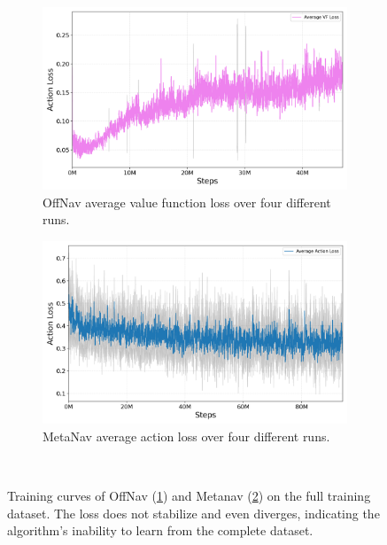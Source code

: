 \begin{figure}
    \centering
    \begin{subfigure}[b]{0.49\linewidth}
        \centering
        \includegraphics[width=\linewidth]{figures/offnav/offnav_losses_avg_std}
        \caption{OffNav average value function loss over four different runs.}
        \label{fig:training_problems_offnav}
    \end{subfigure}
    \hfill
    \begin{subfigure}[b]{0.49\linewidth}
        \centering
        \includegraphics[width=\linewidth]{figures/metanav/metanav_losses_avg_std}
        \caption{MetaNav average action loss over four different runs.}
        \label{fig:training_problems_metanav}
    \end{subfigure}~\caption{Training curves of OffNav (\ref{fig:training_problems_offnav}) and Metanav (\ref{fig:training_problems_metanav}) on the full training dataset. The loss does not stabilize and even diverges, indicating the algorithm's inability to learn from the complete dataset.}
    \label{fig:training_problems}
\end{figure}

